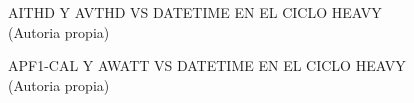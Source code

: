 \begin{figure}[H]
  \hfill
  \hfill
  \hfill
  \caption{AITHD Y AVTHD VS DATETIME EN EL CICLO HEAVY (Autoria propia)}
  \end{figure}
\begin{figure}[H]
  \hfill
  \hfill
  \hfill
  \caption{APF1-CAL Y AWATT VS DATETIME EN EL CICLO HEAVY (Autoria propia)}
  \end{figure}
